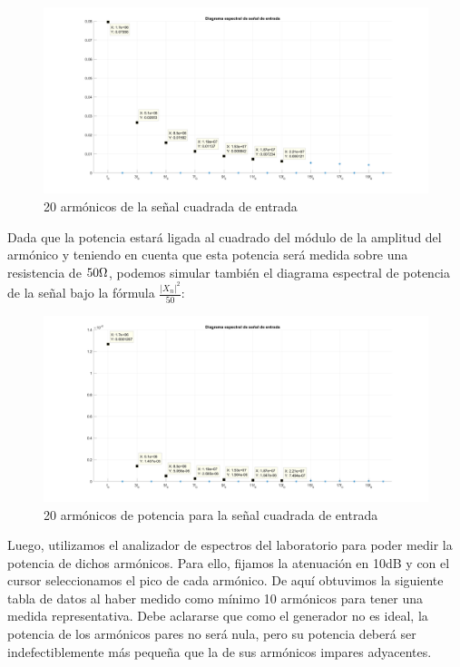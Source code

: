 \documentclass[../../labo_tp5_main.tex]{subfiles}
\begin{document}
\begin{figure}[H]	
	\centering
	\includegraphics[scale=0.2]{imagenes/espectro_cuadrada_20_armonicos.png}
	\caption{20 armónicos de la señal cuadrada de entrada}
	\label{fig:ej1_espectro_cuadrada_20_armonicos}
\end{figure}

Dada que la potencia estará ligada al cuadrado del módulo de la amplitud del armónico y teniendo en cuenta que esta potencia será medida sobre una resistencia de $50\ohm$, podemos simular también el diagrama espectral de potencia de la señal bajo la fórmula $\frac{|X_n|^2}{50}$:\par

\begin{figure}[H]	
	\centering
	\includegraphics[scale=0.2]{imagenes/espectro_cuadrada_potencia.png}
	\caption{20 armónicos de potencia para la señal cuadrada de entrada}
	\label{fig:ej1_espectro_cuadrada_potencia}
\end{figure}

Luego, utilizamos el analizador de espectros del laboratorio para poder medir la potencia de dichos armónicos. Para ello, fijamos la atenuación en 10dB y con el cursor seleccionamos el pico de cada armónico. De aquí obtuvimos la siguiente tabla de datos al haber medido como mínimo 10 armónicos para tener una medida representativa. Debe aclararse que como el generador no es ideal, la potencia de los armónicos pares no será nula, pero su potencia deberá ser indefectiblemente más pequeña que la de sus armónicos impares adyacentes.
\end{document}
